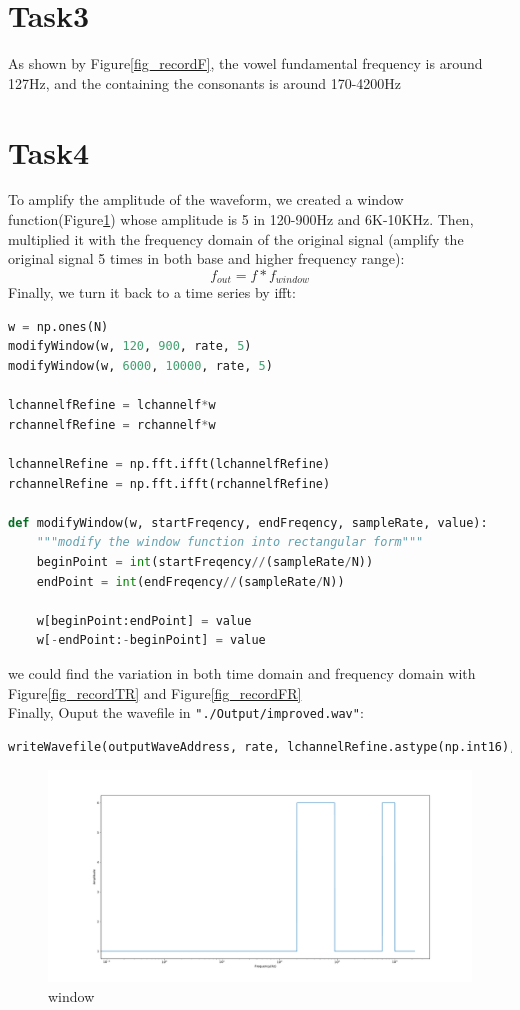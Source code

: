\documentclass[a4paper,12pt]{article}
\begin{document}
\section{Task3}
As shown by Figure\ref{fig_recordF}, the vowel fundamental frequency is around 127Hz, and the containing the consonants is around  170-4200Hz
\section{Task4}
To amplify the amplitude of the waveform,  we created a window function(Figure\ref{fig_window}) whose amplitude is 5 in 120-900Hz and 6K-10KHz. Then,  multiplied it with the frequency domain of the original signal (amplify the original signal 5 times in both base and higher frequency range):
$$f_{out}=f*f_{window}$$
Finally, we turn it back to a time series by ifft:
\begin{lstlisting}[language=Python]
w = np.ones(N)
modifyWindow(w, 120, 900, rate, 5)
modifyWindow(w, 6000, 10000, rate, 5)

lchannelfRefine = lchannelf*w
rchannelfRefine = rchannelf*w

lchannelRefine = np.fft.ifft(lchannelfRefine)
rchannelRefine = np.fft.ifft(rchannelfRefine)

def modifyWindow(w, startFreqency, endFreqency, sampleRate, value):
	"""modify the window function into rectangular form"""
	beginPoint = int(startFreqency//(sampleRate/N))
	endPoint = int(endFreqency//(sampleRate/N))
	
	w[beginPoint:endPoint] = value
	w[-endPoint:-beginPoint] = value
\end{lstlisting}
we could find the variation in both time domain and frequency domain with Figure\ref{fig_recordTR} and Figure\ref{fig_recordFR}\\
Finally, Ouput the wavefile in \lstinline{"./Output/improved.wav"}:
\begin{lstlisting}[language=Python]
writeWavefile(outputWaveAddress, rate, lchannelRefine.astype(np.int16), rchannelRefine.astype(np.int16))
\end{lstlisting}
\begin{figure}[h]   
	\centering 
	\includegraphics[width=12cm]{../Output/Figures/window.pdf} 
	\caption{window}   
	\label{fig_window}
\end{figure}
\end{document}
